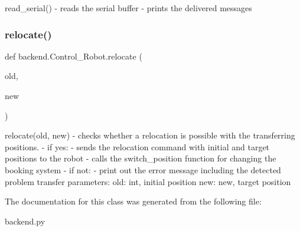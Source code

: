 \begin{DoxyVerb}read_serial()
    - reads the serial buffer
    - prints the delivered messages
\end{DoxyVerb}
 \mbox{\label{classbackend_1_1Control__Robot_a7ea7aa2bb9ce9a16bf6f4ccb42dca12d_a7ea7aa2bb9ce9a16bf6f4ccb42dca12d}} 
\subsubsection{\texorpdfstring{relocate()}{relocate()}}
{\footnotesize\ttfamily def backend.\+Control\+\_\+\+Robot.\+relocate (\begin{DoxyParamCaption}\item[{}]{old,  }\item[{}]{new }\end{DoxyParamCaption})}

\begin{DoxyVerb}relocate(old, new)
    - checks whether a relocation is possible with the transferring positions. 
- if yes:
    - sends the relocation command with initial and target positions to the robot
    - calls the switch_position function for changing the booking system
- if not:
    - print out the error message including the detected problem
transfer parameters:
    old: int, initial position
    new: new, target position
\end{DoxyVerb}
 

The documentation for this class was generated from the following file\+:\begin{DoxyCompactItemize}
\item 
backend.\+py\end{DoxyCompactItemize}
